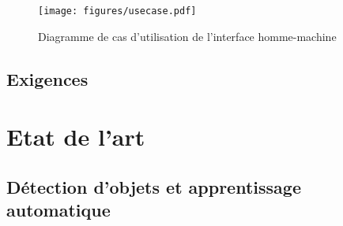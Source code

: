 			\begin{figure}[h]
			{
				\centering
				\texttt{[image: figures/usecase.pdf]}
				\caption{Diagramme de cas d'utilisation de l'interface homme-machine}
				\label{fig:usecase}
			}
			\end{figure}



		\subsection{Exigences}


	\section{Etat de l'art}

		\subsection{Détection d'objets et apprentissage automatique}
			
